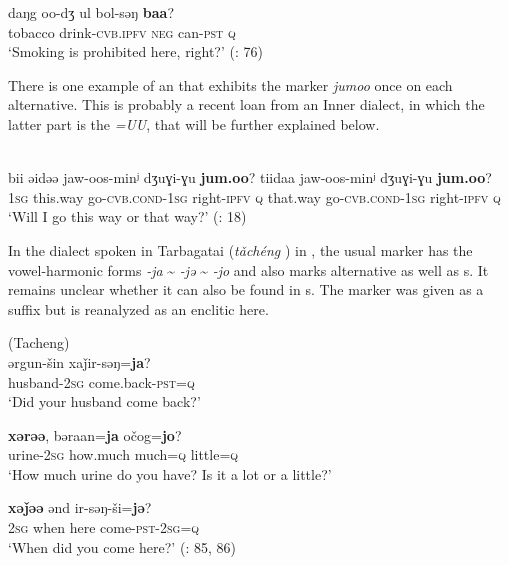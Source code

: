     \ex
    \gll daŋg    oo-dʒ      ul  bol-səŋ \textbf{{baa}}?\\
    tobacco  drink-\textsc{cvb.ipfv}  \textsc{neg}  can-\textsc{pst}  \textsc{q}\\
    \glt ‘Smoking is prohibited here, right?’ (\citealt{ZhongSuchun1982}: 76)
    \z
    \z 

There is one example of an  that exhibits the marker \textit{jumoo} once on each alternative. This is probably a recent loan from an Inner  dialect, in which the latter part is the  \textit{=UU}, that will be further explained below.

\newpage 
\ea%
    \label{ex:mong:10}
    \\
    \gll bii  əidəə {jaw-oo}{s-minʲ} dʒuɣi-ɣu \textbf{{jum}}\textbf{.}\textbf{{o}}\textbf{{o}}? {tiidaa} {jaw-oo}{s-minʲ} {dʒuɣi-ɣu} \textbf{{jum}}\textbf{.}\textbf{{o}}\textbf{{o}}?\\
    1\textsc{sg}  this.way  go-\textsc{cvb.cond}-1\textsc{sg}  right-\textsc{ipfv}  \textsc{q} that.way  go-\textsc{cvb.cond}-1\textsc{sg}    right-\textsc{ipfv}  \textsc{q}\\
    \glt ‘Will I go this way or that way?’ (\citealt{Chaolu1994c}: 18)
    \z

In the  dialect spoken in Tarbagatai (\textit{tǎchéng} ) in , the usual  marker has the vowel-harmonic forms \textit{-ja} {\textasciitilde} \textit{-jə} {\textasciitilde} \textit{-jo} and also marks alternative as well as s. It remains unclear whether it can also be found in s. The marker was given as a suffix but is reanalyzed as an enclitic here.

\ea%
    \label{ex:mong:11}
     (Tacheng)\\
    \ea
    \gll ərgun-šin  xaǰir-səŋ=\textbf{{ja}}?\\
    husband-2\textsc{sg}  come.back-\textsc{pst}=\textsc{q}\\
    \glt ‘Did your husband come back?’
    
    \ex
     \textbf{{xərəə}},    bəraan=\textbf{{ja}} {očog=}\textbf{{jo}}?\\
    urine-2\textsc{sg}  how.much  much=\textsc{q}  little=\textsc{q}\\
    \glt ‘How much urine do you have? Is it a lot or a little?’
    
    \ex
     \textbf{{xəǰəə}} ənd  ir-səŋ-ši=\textbf{{jə}}?\\
    2\textsc{sg}  when  here  come-\textsc{pst}-2\textsc{sg}=\textsc{q}\\
    \glt ‘When did you come here?’ (\citealt{Yu2008}: 85, 86)
    \z
    \z 

